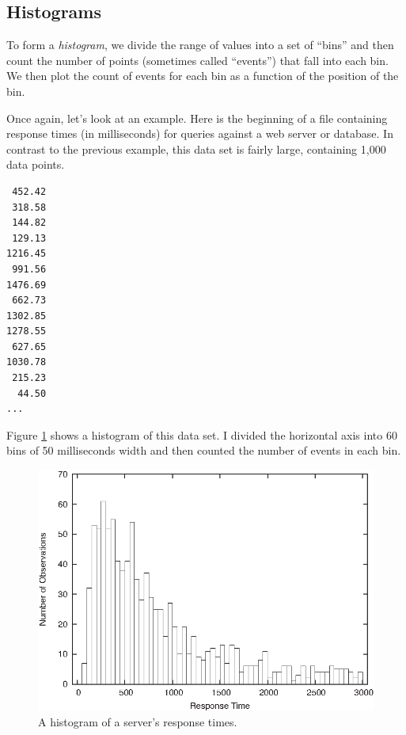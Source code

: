 \subsection{Histograms}

 
To form a \emph{histogram}, we divide the range of values into a set
of ``bins'' and then count the number of points (sometimes called
``events'') that fall into each bin. We then plot the count of events
for each bin as a function of the position of the bin.

Once again, let's look at an example. Here is the beginning of a file
containing response times (in milliseconds) for queries against a web
server or database. In contrast to the previous example, this data
set is fairly large, containing 1,000 data points.

\begin{verbatim}
 452.42
 318.58
 144.82
 129.13
1216.45
 991.56
1476.69
 662.73
1302.85
1278.55
 627.65
1030.78
 215.23
  44.50
...
\end{verbatim}

Figure \ref{fig:serverhisto} shows a histogram of this data set. I
divided the horizontal axis into 60 bins of 50 milliseconds width and
then counted the number of events in each bin.

\begin{figure}
  \centerline{\includegraphics{img/server-data-histo}}
  \caption{A histogram of a server's response times.}
  \label{fig:serverhisto}
\end{figure}\pagebreak

